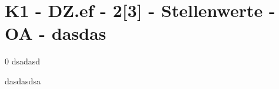\section{K1 - DZ.ef - 2[3] - Stellenwerte - OA - dasdas}

\begin{langesbeispiel}\item[0] %
dsadasd

\end{langesbeispiel}dasdasdsa